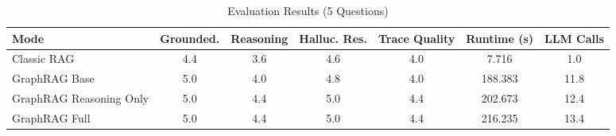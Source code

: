 \documentclass[11pt]{article}
\begin{document}
\begin{table}[htbp]
\centering
{}
\setlength{\arrayrulewidth}{0.9pt}
\renewcommand{\arraystretch}{1.2}

\caption{Evaluation Results (5 Questions)}
\label{tab:evaluation_results}

\begin{tabular}{|l|c|c|c|c|c|c|}
\hline
\rowcolor{white}
\textbf{Mode} & \textbf{Grounded.} & \textbf{Reasoning} & \textbf{Halluc. Res.} & \textbf{Trace Quality} & \textbf{Runtime (s)} & \textbf{LLM Calls} \\
\hline
\rowcolor{white}
Classic RAG             & 4.4 & 3.6 & 4.6 & 4.0 & 7.716   & 1.0 \\
\hline
\rowcolor{white}
GraphRAG Base           & 5.0 & 4.0 & 4.8 & 4.0 & 188.383 & 11.8 \\
\hline
\rowcolor{white}
GraphRAG Reasoning Only & 5.0 & 4.4 & 5.0 & 4.4 & 202.673 & 12.4 \\
\hline
\rowcolor{white}
GraphRAG Full           & 5.0 & 4.4 & 5.0 & 4.4 & 216.235 & 13.4 \\
\hline
\end{tabular}
\end{table}
\end{document}

